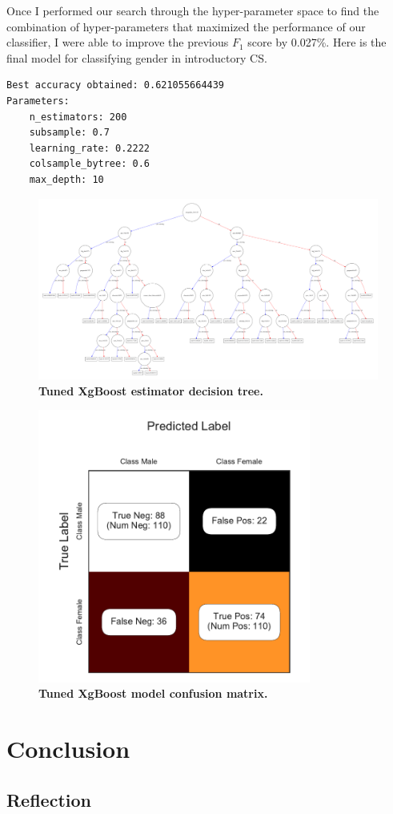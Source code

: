 Once I performed our search through the hyper-parameter space to find the combination of hyper-parameters that maximized the performance of our classifier, I were able to improve the previous $F_1$ score by 0.027\%. Here is the final model for classifying gender in introductory CS. 
\begin{verbatim}
Best accuracy obtained: 0.621055664439
Parameters:
    n_estimators: 200
    subsample: 0.7
    learning_rate: 0.2222
    colsample_bytree: 0.6
    max_depth: 10

\end{verbatim}

\begin{figure}[!hbtp]
\centering
    \includegraphics[width=1.4\textwidth]{figures/Tuned_model_graph}
    \caption{\textbf{Tuned XgBoost estimator decision tree. }\textit{}}\label{tuned_plot_tree}
\end{figure}

\begin{figure}[!hbtp]
\centering
    \includegraphics[width=0.8\textwidth]{figures/tuned_model_CM}
    \caption{\textbf{Tuned XgBoost model confusion matrix. }\textit{}}\label{tuned_CM}
\end{figure}


\chapter*{Conclusion}



\section*{Reflection}

